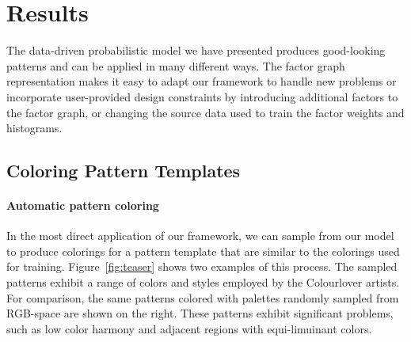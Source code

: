 \section{Results}
\label{sec:results}

The data-driven probabilistic model we have presented produces good-looking patterns and can be applied in many different ways. The factor graph representation makes it easy to adapt our framework to handle new problems or incorporate user-provided design constraints by introducing additional factors to the factor graph, or changing the source data used to train the factor weights and histograms.



\subsection{Coloring Pattern Templates}

\paragraph{Automatic pattern coloring} In the most direct application of our framework, we can sample from our model to produce colorings for a pattern template that are similar to the colorings used for training. Figure~\ref{fig:teaser} shows two examples of this process. The sampled patterns exhibit a range of colors and styles employed by the Colourlover artists. For comparison, the same patterns colored with palettes randomly sampled from RGB-space are shown on the right. These patterns exhibit significant problems, such as low color harmony and adjacent regions with equi-limuinant colors.

